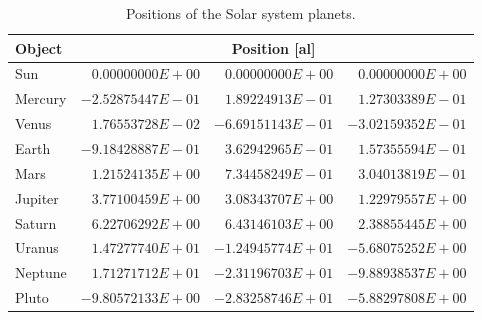 \documentclass[a4paper,12pt,openany]{book}
\theoremstyle{break}
\begin{document}
\begin{table}
\begin{center}
\caption{Positions of the Solar system planets.}\label{tbl:solarsystempos}
\begin{tabular}{ l r r r }
\toprule[1.5pt]
\bf Object & \multicolumn{3}{c}{\bf Position [al]} \\
\midrule
Sun & $0.00000000E+00$  &  $0.00000000E+00$  &  $0.00000000E+00$ \\
Mercury & $-2.52875447E-01$  &  $1.89224913E-01$  &  $1.27303389E-01$ \\
Venus & $1.76553728E-02$  &  $-6.69151143E-01$  &  $-3.02159352E-01$ \\
Earth & $-9.18428887E-01$  &  $3.62942965E-01$  &  $1.57355594E-01$ \\
Mars & $1.21524135E+00$  &  $7.34458249E-01$  &  $3.04013819E-01$ \\
Jupiter & $3.77100459E+00$  &  $3.08343707E+00$  &  $1.22979557E+00$ \\
Saturn & $6.22706292E+00$  &  $6.43146103E+00$  &  $2.38855445E+00$ \\
Uranus & $1.47277740E+01$  &  $-1.24945774E+01$  &  $-5.68075252E+00$ \\
Neptune & $1.71271712E+01$  &  $-2.31196703E+01$  &  $-9.88938537E+00$ \\
Pluto & $-9.80572133E+00$  &  $-2.83258746E+01$  &  $-5.88297808E+00$ \\
\bottomrule[1.25pt]
\end{tabular}
\end{center}
\end{table}
\end{document}
